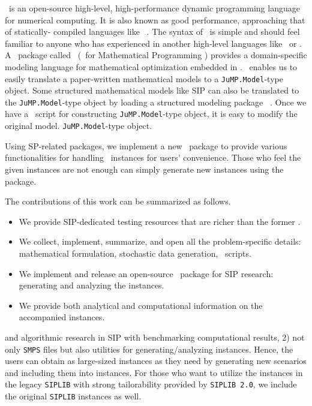 \julia\ is an open-source high-level, high-performance dynamic programming language for 
numerical computing. It is also known as good performance, approaching that of statically-
compiled languages like \clang\ \cite{journal:BEKS2017}. The syntax of \julia\ is simple and 
should feel familiar to anyone who has experienced in another high-level languages like 
\matlab\ or \python. A \julia\ package called \jump\ (\julia\ for Mathematical Programming 
\cite{journal:JuMP}) provides a domain-specific modeling language for mathematical 
optimization embedded in \julia. \jump\ enables us to easily translate a paper-written 
mathematical models to a \texttt{JuMP.Model}-type object. Some structured mathematical models 
like SIP can also be translated to the \texttt{JuMP.Model}-type object by loading a 
structured modeling package \structjump\ \cite{web:StructJuMP}. Once we have a \julia\ script 
for constructing \texttt{JuMP.Model}-type object, it is easy to modify the original model. 
\texttt{JuMP.Model}-type object. 

Using SP-related packages, we implement a new \julia\ package to provide various 
functionalities for handling \siplibtwo\ instances for users' convenience. Those who feel the 
given instances are not enough can simply generate new instances using the package.


The contributions of this work can be summarized as follows.
\begin{itemize}
	\item We provide SIP-dedicated testing resources that are richer than the former \siplib.
	\item We collect, implement, summarize, and open all the problem-specific details: 
	mathematical formulation, stochastic data generation, \julia\ scripts.
	\item We implement and release an open-source \julia\ package for SIP research: 
	generating and analyzing the instances.
	\item We provide both analytical and computational information on the accompanied 
	instances.
\end{itemize}

and algorithmic research in SIP with benchmarking computational results, 2) not only 
\texttt{SMPS} files but also utilities for generating/analyzing instances. Hence, the users 
can obtain as large-sized instances as they need by generating new scenarios and including 
them into instances. For those who want to utilize the instances in the legacy 
\texttt{SIPLIB} with strong tailorability provided by \texttt{SIPLIB 2.0}, we include the 
original \texttt{SIPLIB} instances as well.

